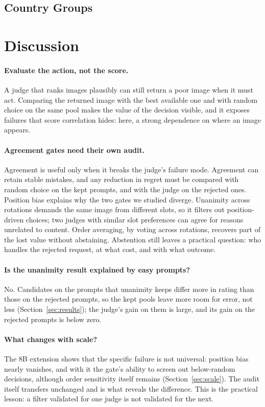 \documentclass[letterpaper]{article}
\begin{document}
\subsection{Country Groups}


\section{Discussion}
\paragraph{Evaluate the action, not the score.}
A judge that ranks images plausibly can still return a poor image when it must act. Comparing the returned image with the best available one and with random choice on the same pool makes the value of the decision visible, and it exposes failures that score correlation hides: here, a strong dependence on where an image appears.

\paragraph{Agreement gates need their own audit.}
Agreement is useful only when it breaks the judge's failure mode. Agreement can retain stable mistakes, and any reduction in regret must be compared with random choice on the kept prompts, and with the judge on the rejected ones. Position bias explains why the two gates we studied diverge. Unanimity across rotations demands the same image from different slots, so it filters out position-driven choices; two judges with similar slot preferences can agree for reasons unrelated to content. Order averaging, by voting across rotations, recovers part of the lost value without abstaining. Abstention still leaves a practical question: who handles the rejected request, at what cost, and with what outcome.

\paragraph{Is the unanimity result explained by easy prompts?}
No. Candidates on the prompts that unanimity keeps differ more in rating than those on the rejected prompts, so the kept pools leave more room for error, not less (Section~\ref{sec:results}); the judge's gain on them is large, and its gain on the rejected prompts is below zero.

\paragraph{What changes with scale?}
The 8B extension shows that the specific failure is not universal: position bias nearly vanishes, and with it the gate's ability to screen out below-random decisions, although order sensitivity itself remains (Section~\ref{sec:scale}). The audit itself transfers unchanged and is what reveals the difference. This is the practical lesson: a filter validated for one judge is not validated for the next.
\end{document}
